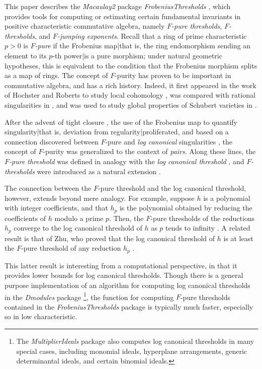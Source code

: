 \documentclass{amsart}
\begin{document}
This paper describes the \emph{Macaulay2} package \emph{FrobeniusThresholds} \cite{M2, FThresholdsPackage}, which provides tools for computing or estimating certain fundamental invariants in positive characteristic commutative algebra, namely \emph{$F$-pure thresholds}, \emph{$F$-thresholds}, and \emph{$F$-jumping exponents}.
Recall that a ring of prime characteristic $p>0$ is \emph{$F$-pure} if the Frobenius map|that is, the ring endomorphism sending an element to its $p$-th power|is a pure morphism;  under natural geometric hypotheses, this is equivalent to the condition that the Frobenius morphism splits as a map of rings.
The concept of $F$-purity has proven to be important in commutative algebra, and has a rich history.
Indeed, it first appeared in the work of Hochster and Roberts to study local cohomology \cite{HochsterRobertsFrobeniusLocalCohomology}, was compared with rational singularities in  \cite{FedderFPureRat}, and was used to study global properties of Schubert varieties in \cite{MehtaRamanathanFrobeniusSplittingAndCohomologyVanishing}.

After the advent of tight closure \cite{HochsterHunekeTC1}, the use of the Frobenius map to quantify singularity|that is, deviation from regularity|proliferated, and based on a connection discovered between $F$-pure and \emph{log canonical} singularities \cite{HaraWatanabeFRegFPure}, the concept of $F$-purity was generalized to the context of \emph{pairs}.
Along these lines, the \emph{$F$-pure threshold} was defined in analogy with the \emph{log canonical threshold} \cite{TakagiWatanabeFPureThresh}, and \emph{$F$-thresholds} were introduced as a natural extension \cite{MustataTakagiWatanabeFThresholdsAndBernsteinSato}.

The connection between the $F$-pure threshold and the log canonical threshold, however, extends beyond mere analogy.
For example, suppose $h$ is a polynomial with integer coefficients, and that $h_p$ is the polynomial obtained by reducing the coefficients of $h$ modulo a prime $p$.  Then, the $F$-pure thresholds of the reductions $h_p$ converge to the log canonical threshold of $h$ as $p$ tends to infinity \cite{HaraYoshidaGeneralizationOfTightClosure}.
A related result is that of Zhu, who proved that the log canonical threshold of $h$ is at least the $F$-pure threshold of any reduction $h_p$ \cite[Corollary 4.2]{ZhuLogCanoincalThresholdsInPositiveChar}.

This latter result is interesting from a computational perspective, in that it provides lower bounds for log canonical thresholds.
Though there is a general purpose implementation of an algorithm for computing log canonical thresholds in the \emph{Dmodules} package \cite{DmodulesSource}\footnote{The \emph{MultiplierIdeals} package \cite{MultiplierIdealsPackage, MultiplierIdealsArticle} also computes log canonical thresholds in many special cases, including monomial ideals, hyperplane arrangements, generic determinantal ideals, and certain binomial ideals.
}, the function for computing $F$-pure thresholds contained in the \emph{FrobeniusThresholds} package is typically much faster, especially so in low characteristic.
\end{document}
